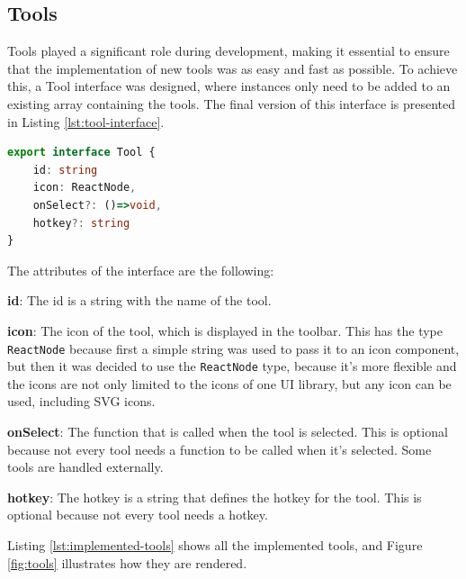 \subsection{Tools}
Tools played a significant role during development, making it essential to ensure that the implementation of new tools was as easy and fast as possible. To achieve this, a Tool interface was designed, where instances only need to be added to an existing array containing the tools. The final version of this interface is presented in Listing \ref{lst:tool-interface}.

\begin{lstlisting}[language=TypeScript,caption={Tool interface},label={lst:tool-interface}]
export interface Tool {
    id: string
    icon: ReactNode,
    onSelect?: ()=>void,
    hotkey?: string
}
\end{lstlisting}

The attributes of the interface are the following:
\begin{compactitem}
\item \textbf{id}: The id is a string with the name of the tool.
\item \textbf{icon}: The icon of the tool, which is displayed in the toolbar. This has the type \texttt{ReactNode} because first a simple string was used to pass it to an icon component, but then it was decided to use the \texttt{ReactNode} type, because it's more flexible and the icons are not only limited to the icons of one UI library, but any icon can be used, including SVG icons.
\item \textbf{onSelect}: The function that is called when the tool is selected. This is optional because not every tool needs a function to be called when it's selected. Some tools are handled externally.
\item \textbf{hotkey}: The hotkey is a string that defines the hotkey for the tool. This is optional because not every tool needs a hotkey.
\end{compactitem}

Listing \ref{lst:implemented-tools} shows all the implemented tools, and Figure \ref{fig:tools} illustrates how they are rendered.

